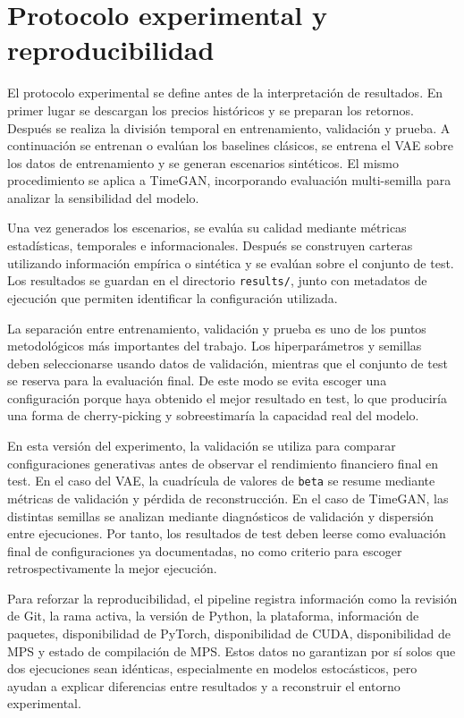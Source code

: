 \documentclass[11pt,a4paper,spanish,oneside]{book}
\numberwithin{equation}{chapter}
\numberwithin{figure}{chapter}
\begin{document}
\section{Protocolo experimental y reproducibilidad}

El protocolo experimental se define antes de la interpretación de resultados. En primer lugar se descargan los precios históricos y se preparan los retornos. Después se realiza la división temporal en entrenamiento, validación y prueba. A continuación se entrenan o evalúan los baselines clásicos, se entrena el VAE sobre los datos de entrenamiento y se generan escenarios sintéticos. El mismo procedimiento se aplica a TimeGAN, incorporando evaluación multi-semilla para analizar la sensibilidad del modelo.

Una vez generados los escenarios, se evalúa su calidad mediante métricas estadísticas, temporales e informacionales. Después se construyen carteras utilizando información empírica o sintética y se evalúan sobre el conjunto de test. Los resultados se guardan en el directorio \texttt{results/}, junto con metadatos de ejecución que permiten identificar la configuración utilizada.

La separación entre entrenamiento, validación y prueba es uno de los puntos metodológicos más importantes del trabajo. Los hiperparámetros y semillas deben seleccionarse usando datos de validación, mientras que el conjunto de test se reserva para la evaluación final. De este modo se evita escoger una configuración porque haya obtenido el mejor resultado en test, lo que produciría una forma de cherry-picking y sobreestimaría la capacidad real del modelo.

En esta versión del experimento, la validación se utiliza para comparar configuraciones generativas antes de observar el rendimiento financiero final en test. En el caso del VAE, la cuadrícula de valores de \texttt{beta} se resume mediante métricas de validación y pérdida de reconstrucción. En el caso de TimeGAN, las distintas semillas se analizan mediante diagnósticos de validación y dispersión entre ejecuciones. Por tanto, los resultados de test deben leerse como evaluación final de configuraciones ya documentadas, no como criterio para escoger retrospectivamente la mejor ejecución.

Para reforzar la reproducibilidad, el pipeline registra información como la revisión de Git, la rama activa, la versión de Python, la plataforma, información de paquetes, disponibilidad de PyTorch, disponibilidad de CUDA, disponibilidad de MPS y estado de compilación de MPS. Estos datos no garantizan por sí solos que dos ejecuciones sean idénticas, especialmente en modelos estocásticos, pero ayudan a explicar diferencias entre resultados y a reconstruir el entorno experimental.
\end{document}
